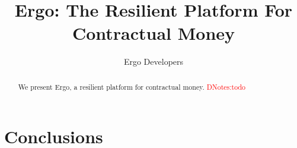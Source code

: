 \documentclass[]{article}
\newcommand{\dnote}[1]{{\textcolor{red}{DNotes:{#1}}}}
\begin{document}
    \title{Ergo: The Resilient Platform For Contractual Money}
    \author{Ergo Developers}


    \maketitle

    \begin{abstract}
        We present Ergo, a resilient platform for contractual money.
        \dnote{todo}
    \end{abstract}


    

    

    

    

    

    

    \section{Conclusions}
    \label{sec:conclusions}

    
\end{document}
